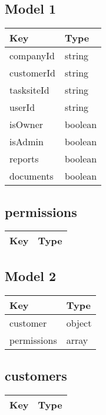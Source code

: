 \documentclass[10pt]{article}
\begin{document}
            \subsection{Model 1}
            
            \begin{tabularx}{\textwidth}{lZ}
                \textbf{Key} & \textbf{Type} \\
                \hline
                    companyId & string \\
                    customerId & string \\
                    tasksiteId & string \\
                    userId & string \\
                    isOwner & boolean \\
                    isAdmin & boolean \\
                    reports & boolean \\
                    documents & boolean \\
            \end{tabularx}
            \subsection{permissions}
            
            \begin{tabularx}{\textwidth}{lZ}
                \textbf{Key} & \textbf{Type} \\
                \hline
            \end{tabularx}
            \subsection{Model 2}
            
            \begin{tabularx}{\textwidth}{lZ}
                \textbf{Key} & \textbf{Type} \\
                \hline
                    customer & object \\
                    permissions & array \\
            \end{tabularx}
            \subsection{customers}
            
            \begin{tabularx}{\textwidth}{lZ}
                \textbf{Key} & \textbf{Type} \\
                \hline
            \end{tabularx}
\end{document}
